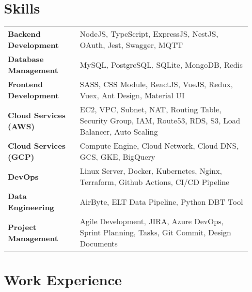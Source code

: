 \documentclass {article}
\begin{document}
\section{Skills}
\begin{tabularx}{\linewidth}{@{}l X@{}}
  \textbf{Backend Development} & NodeJS, TypeScript, ExpressJS, NestJS, OAuth, Jest, Swagger, MQTT\\
  \textbf{Database Management} & MySQL, PostgreSQL, SQLite, MongoDB, Redis\\ 
  \textbf{Frontend Development} & SASS, CSS Module, ReactJS, VueJS, Redux, Vuex, Ant Design, Material UI\\ 
  \textbf{Cloud Services (AWS)} & EC2, VPC, Subnet, NAT, Routing Table, Security Group, IAM, Route53, RDS, S3, Load Balancer, Auto Scaling\\ 
  \textbf{Cloud Services (GCP)} & Compute Engine, Cloud Network, Cloud DNS, GCS, GKE, BigQuery\\
  \textbf{DevOps} & Linux Server, Docker, Kubernetes, Nginx,  Terraform, Github Actions, CI/CD Pipeline\\
  \textbf{Data Engineering} & AirByte, ELT Data Pipeline, Python DBT Tool\\
  \textbf{Project Management} & Agile Development, JIRA, Azure DevOps, Sprint Planning, Tasks, Git Commit, Design Documents\\
\end{tabularx}

\section{Work Experience}
\end{document}
